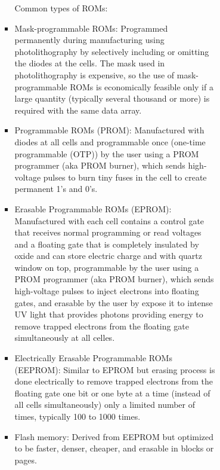 \documentclass[a4paper,12pt]{article}
\begin{document}
\begin{itemize}
\begin{itemize}
\begin{itemize}
\begin{itemize}
\begin{itemize}
\begin{itemize}
\begin{itemize}
Common types of ROMs:
\bit
\item Mask-programmable ROMs: Programmed permanently during manufacturing using photolithography by selectively including or omitting the diodes at the cells. The mask used in photolithography is expensive, so the use of mask-programmable ROMs is economically feasible only if a large quantity (typically several thousand or more) is required with the same data array.
\item Programmable ROMs (PROM): Manufactured with diodes at all cells and programmable once (one-time programmable (OTP)) by the user using a PROM programmer (aka PROM burner), which sends high-voltage pulses to burn tiny fuses in the cell to create permanent 1's and 0's.
\item Erasable Programmable ROMs (EPROM): Manufactured with each cell contains a control gate that receives normal programming or read voltages and a floating gate that is completely insulated by oxide and can store electric charge and with quartz window on top, programmable by the user using a PROM programmer (aka PROM burner), which sends high-voltage pulses to inject electrons into floating gates, and erasable by the user by expose it to intense UV light that provides photons providing energy to remove trapped electrons from the floating gate simultaneously at all celles.
\item Electrically Erasable Programmable ROMs (EEPROM): Similar to EPROM but erasing process is done electrically to remove trapped electrons from the floating gate one bit or one byte at a time (instead of all cells simultaneously) only a limited number of times, typically 100 to 1000 times.
\item Flash memory: Derived from EEPROM but optimized to be faster, denser, cheaper, and erasable in blocks or pages.


\end{itemize}
\end{itemize}
\end{itemize}
\end{itemize}
\end{itemize}
\end{itemize}
\end{itemize}
\end{document}
